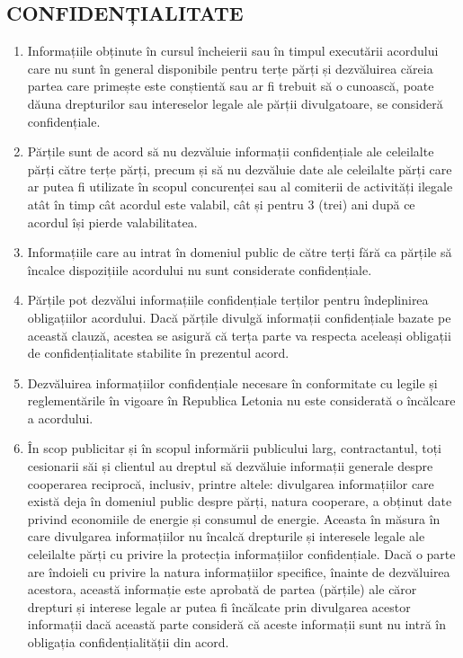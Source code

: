 \begin{multicols}{2}
\subsection{CONFIDENȚIALITATE}
\begin{enumerate}
\item Informațiile obținute în cursul încheierii sau în timpul executării acordului care nu sunt în general disponibile pentru terțe părți și dezvăluirea căreia partea care primește este conștientă sau ar fi trebuit să o cunoască, poate dăuna drepturilor sau intereselor legale ale părții divulgatoare, se consideră confidențiale.
\item Părțile sunt de acord să nu dezvăluie informații confidențiale ale celeilalte părți către terțe părți, precum și să nu dezvăluie date ale celeilalte părți care ar putea fi utilizate în scopul concurenței sau al comiterii de activități ilegale atât în ​​timp cât acordul este valabil, cât și pentru 3 (trei) ani după ce acordul își pierde valabilitatea.
\item Informațiile care au intrat în domeniul public de către terți fără ca părțile să încalce dispozițiile acordului nu sunt considerate confidențiale.
\item Părțile pot dezvălui informațiile confidențiale terților pentru îndeplinirea obligațiilor acordului. Dacă părțile divulgă informații confidențiale bazate pe această clauză, acestea se asigură că terța parte va respecta aceleași obligații de confidențialitate stabilite în prezentul acord.
\item Dezvăluirea informațiilor confidențiale necesare în conformitate cu legile și reglementările în vigoare în Republica Letonia nu este considerată o încălcare a acordului.
\item În scop publicitar și în scopul informării publicului larg, contractantul, toți cesionarii săi și clientul au dreptul să dezvăluie informații generale despre cooperarea reciprocă, inclusiv, printre altele: divulgarea informațiilor care există deja în domeniul public despre părți, natura cooperare, a obținut date privind economiile de energie și consumul de energie. Aceasta în măsura în care divulgarea informațiilor nu încalcă drepturile și interesele legale ale celeilalte părți cu privire la protecția informațiilor confidențiale. Dacă o parte are îndoieli cu privire la natura informațiilor specifice, înainte de dezvăluirea acestora, această informație este aprobată de partea (părțile) ale căror drepturi și interese legale ar putea fi încălcate prin divulgarea acestor informații dacă această parte consideră că aceste informații sunt nu intră în obligația confidențialității din acord.

\end{enumerate}
\end{multicols}
